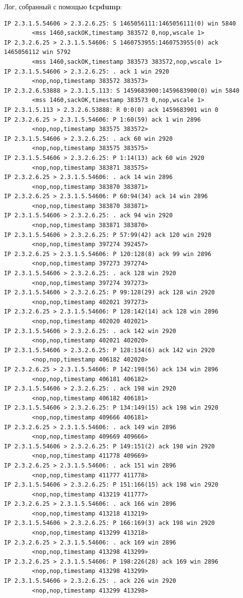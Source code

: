 \documentclass[a4paper,12pt]{article}
\begin{document}
Лог, собранный с помощью \textbf{tcpdump}:
\begin{verbatim}
IP 2.3.1.5.54606 > 2.3.2.6.25: S 1465056111:1465056111(0) win 5840 
		<mss 1460,sackOK,timestamp 383572 0,nop,wscale 1>
IP 2.3.2.6.25 > 2.3.1.5.54606: S 1460753955:1460753955(0) ack 1465056112 win 5792 
		<mss 1460,sackOK,timestamp 383573 383572,nop,wscale 1>
IP 2.3.1.5.54606 > 2.3.2.6.25: . ack 1 win 2920 
		<nop,nop,timestamp 383572 383573>
IP 2.3.2.6.53888 > 2.3.1.5.113: S 1459683900:1459683900(0) win 5840 
		<mss 1460,sackOK,timestamp 383573 0,nop,wscale 1>
IP 2.3.1.5.113 > 2.3.2.6.53888: R 0:0(0) ack 1459683901 win 0
IP 2.3.2.6.25 > 2.3.1.5.54606: P 1:60(59) ack 1 win 2896 
		<nop,nop,timestamp 383575 383572>
IP 2.3.1.5.54606 > 2.3.2.6.25: . ack 60 win 2920 
		<nop,nop,timestamp 383575 383575>
IP 2.3.1.5.54606 > 2.3.2.6.25: P 1:14(13) ack 60 win 2920 
		<nop,nop,timestamp 383871 383575>
IP 2.3.2.6.25 > 2.3.1.5.54606: . ack 14 win 2896 
		<nop,nop,timestamp 383870 383871>
IP 2.3.2.6.25 > 2.3.1.5.54606: P 60:94(34) ack 14 win 2896 
		<nop,nop,timestamp 383870 383871>
IP 2.3.1.5.54606 > 2.3.2.6.25: . ack 94 win 2920 
		<nop,nop,timestamp 383871 383870>
IP 2.3.1.5.54606 > 2.3.2.6.25: P 57:99(42) ack 120 win 2920 
		<nop,nop,timestamp 397274 392457>
IP 2.3.2.6.25 > 2.3.1.5.54606: P 120:128(8) ack 99 win 2896 
		<nop,nop,timestamp 397273 397274>
IP 2.3.1.5.54606 > 2.3.2.6.25: . ack 128 win 2920 
		<nop,nop,timestamp 397274 397273>
IP 2.3.1.5.54606 > 2.3.2.6.25: P 99:128(29) ack 128 win 2920 
		<nop,nop,timestamp 402021 397273>
IP 2.3.2.6.25 > 2.3.1.5.54606: P 128:142(14) ack 128 win 2896 
		<nop,nop,timestamp 402020 402021>
IP 2.3.1.5.54606 > 2.3.2.6.25: . ack 142 win 2920 
		<nop,nop,timestamp 402021 402020>
IP 2.3.1.5.54606 > 2.3.2.6.25: P 128:134(6) ack 142 win 2920 
		<nop,nop,timestamp 406182 402020>
IP 2.3.2.6.25 > 2.3.1.5.54606: P 142:198(56) ack 134 win 2896 
		<nop,nop,timestamp 406181 406182>
IP 2.3.1.5.54606 > 2.3.2.6.25: . ack 198 win 2920 
		<nop,nop,timestamp 406182 406181>
IP 2.3.1.5.54606 > 2.3.2.6.25: P 134:149(15) ack 198 win 2920 
		<nop,nop,timestamp 409666 406181>
IP 2.3.2.6.25 > 2.3.1.5.54606: . ack 149 win 2896 
		<nop,nop,timestamp 409669 409666>
IP 2.3.1.5.54606 > 2.3.2.6.25: P 149:151(2) ack 198 win 2920 
		<nop,nop,timestamp 411778 409669>
IP 2.3.2.6.25 > 2.3.1.5.54606: . ack 151 win 2896 
		<nop,nop,timestamp 411777 411778>
IP 2.3.1.5.54606 > 2.3.2.6.25: P 151:166(15) ack 198 win 2920 
		<nop,nop,timestamp 413219 411777>
IP 2.3.2.6.25 > 2.3.1.5.54606: . ack 166 win 2896 
		<nop,nop,timestamp 413218 413219>
IP 2.3.1.5.54606 > 2.3.2.6.25: P 166:169(3) ack 198 win 2920 
		<nop,nop,timestamp 413299 413218>
IP 2.3.2.6.25 > 2.3.1.5.54606: . ack 169 win 2896 
		<nop,nop,timestamp 413298 413299>
IP 2.3.2.6.25 > 2.3.1.5.54606: P 198:226(28) ack 169 win 2896 
		<nop,nop,timestamp 413298 413299>
IP 2.3.1.5.54606 > 2.3.2.6.25: . ack 226 win 2920 
		<nop,nop,timestamp 413299 413298>
\end{verbatim}
\end{document}
